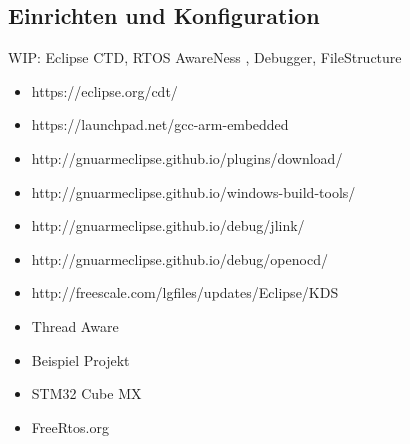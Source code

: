 \documentclass[ngerman]{seminarvorlage}
\begin{document}
\subsection{Einrichten und Konfiguration}
\label{sec:Einrichtung und Konfiguration}
WIP: Eclipse CTD, RTOS AwareNess , Debugger, FileStructure
\begin{itemize}
	\item https://eclipse.org/cdt/
	\item https://launchpad.net/gcc-arm-embedded
\item http://gnuarmeclipse.github.io/plugins/download/
\item http://gnuarmeclipse.github.io/windows-build-tools/
\item http://gnuarmeclipse.github.io/debug/jlink/
\item http://gnuarmeclipse.github.io/debug/openocd/
\item http://freescale.com/lgfiles/updates/Eclipse/KDS
\item Thread Aware 
\item Beispiel Projekt
\item STM32 Cube MX
\item FreeRtos.org
\end{itemize}
\end{document}
